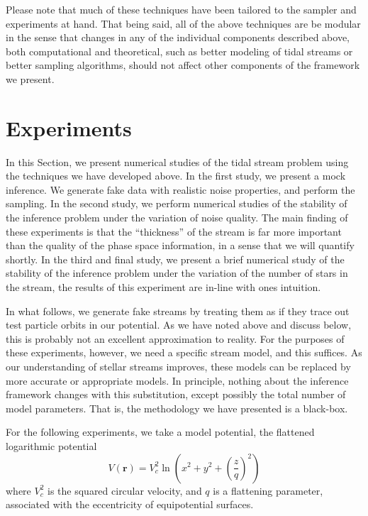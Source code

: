 \documentclass[12pt,preprint]{aastex}
\theoremstyle{plain}
\theoremstyle{definition}
\newcommand{\mtensor}[1]{\boldsymbol{#1}}
\newcommand{\mvector}[1]{\mtensor{#1}}
\renewcommand{\vr}{\mvector{r}}
\newcommand{\sectionname}{Section}
\begin{document}
Please note that much of these techniques have been tailored to the sampler and experiments at hand. That being said, all of the above techniques are be modular in the sense that changes in any of the individual components described above, both computational and theoretical, such as better modeling of tidal streams or better sampling algorithms, should not affect other components of the framework we present. 

\section{\label{sec:exp} Experiments}
In this \sectionname, we present numerical studies of the tidal stream problem using the techniques we have developed above. In the first study, we present a mock inference. We generate fake data with realistic noise properties, and perform the sampling. In the second study, we perform numerical studies of the stability of the inference problem under the variation of noise quality. The main finding of these experiments is that the ``thickness'' of the stream is far more important than the quality of the phase space information, in a sense that we will quantify shortly. In the third and final study, we present a brief numerical study of the stability of the inference problem under the variation of the number of stars in the stream, the results of this experiment are in-line with ones intuition.

In what follows, we generate fake streams by treating them as if they trace out test particle orbits in our potential. As we have noted above and discuss below, this is probably not an excellent 
approximation to reality.  For the purposes of these experiments, however, we need a
specific stream model, and this suffices.  As our understanding of
stellar streams improves, these models can be replaced by more accurate or  
appropriate models. In principle, nothing about the inference framework changes 
with this substitution, except possibly the total number of model parameters. That is, the methodology we have presented is a black-box.

For the following experiments, we take a model potential, the flattened logarithmic potential 
\begin{equation}
V(\vr) = V_c^2 \ln(x^2 + y^2 + (\frac{z}{q})^2)
\end{equation}
where $V_c^2$ is the squared circular velocity, and $q$ is a flattening parameter, associated with the eccentricity of equipotential surfaces. 
\end{document}
